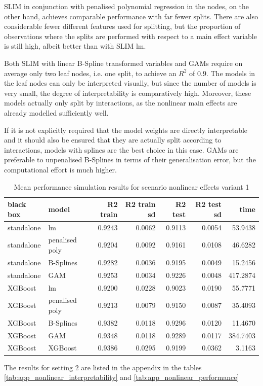 SLIM in conjunction with penalised polynomial regression in the nodes, on the other hand, achieves comparable performance with far fewer splits.
There are also considerable fewer different features used for splitting, but the proportion of observations where the splits are performed with respect to a main effect variable is still high, albeit better than with SLIM lm.

Both SLIM with linear B-Spline transformed variables and GAMs require on average only two leaf nodes, i.e. one split, to achieve an $R^2$ of $0.9$. The models in the leaf nodes can only be interpreted visually, but since the number of models is very small, the degree of interpretability is comparatively high. Moreover, these models actually only split by interactions, as the nonlinear main effects are already modelled sufficiently well. 

If it is not explicitly required that the model weights are directly interpretable and it should also be ensured that they are actually split according to interactions, models with splines are the best choice in this case. GAMs are preferable to unpenalised B-Splines in terms of their generalisation error, but the computational effort is much higher.




\begin{table}[!htb]

\centering \footnotesize
\begin{tabular}[t]{l|l|r|r|r|r|r}
\hline
black box & model & R2 train & R2 train sd & R2 test & R2 test sd & time\\
\hline
standalone & lm & 0.9243 & 0.0062 & 0.9113 & 0.0054 & 53.9438\\
standalone & penalised poly & 0.9204 & 0.0092 & 0.9161 & 0.0108 & 46.6282\\
standalone & B-Splines & 0.9282 & 0.0036 & 0.9195 & 0.0049 & 15.2456\\
standalone & GAM & 0.9253 & 0.0034 & 0.9226 & 0.0048 & 417.2874\\
\hline
XGBoost & lm & 0.9200 & 0.0228 & 0.9023 & 0.0190 & 55.7771\\
XGBoost & penalised poly & 0.9213 & 0.0079 & 0.9150 & 0.0087 & 35.4093\\
XGBoost & B-Splines & 0.9382 & 0.0118 & 0.9296 & 0.0120 & 11.4670\\
XGBoost & GAM & 0.9348 & 0.0118 & 0.9289 & 0.0117 & 384.7403\\
\hline
XGBoost & XGBoost & 0.9386 & 0.0295 & 0.9199 & 0.0362 & 3.1163\\
\hline
\end{tabular}
\caption{Mean performance simulation results for scenario nonlinear effects variant 1}

\end{table}






The results for setting 2 are listed in the appendix in the tables \ref{tab:app_nonlinear_interpretability} and \ref{tab:app_nonlinear_performance}